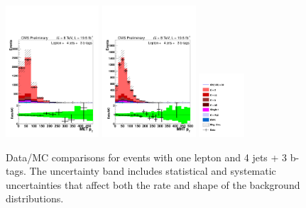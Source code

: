 \begin{figure}[hbtp]
\begin{center}
   \includegraphics[width=0.31\textwidth]{Figures/Analysis_2_Diagrams/LJ_plots_lep/4j3t/lep_met_pt_4j3t_cumulative_wRatio_noLegend_lin.pdf}
   \includegraphics[width=0.31\textwidth]{Figures/Analysis_2_Diagrams/LJ_plots_lep/4j3t/lep_mht_pt_4j3t_cumulative_wRatio_noLegend_lin.pdf}
   \includegraphics[width=0.15\textwidth]{Figures/Analysis_2_Diagrams/LJ_plots_lep/ttH_legend_1columns.pdf}
   \caption{Data/MC comparisons for events with one lepton and 4 jets + 3 b-tags.  The uncertainty band includes statistical and systematic uncertainties that affect both the rate and shape of the background distributions.}
   \label{fig:lj_input_II_4j3t}
 \end{center}
\end{figure}

\clearpage


